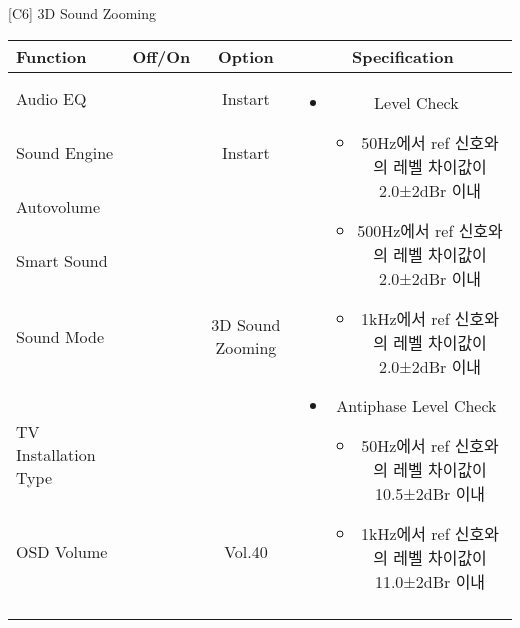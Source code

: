 \begin{frame}[t]{[C6] 3D Sound Zooming}
\begin{tiny}
\begin{tabular}{@{}lccc@{}}
\toprule
Function & Off/On & Option & Specification \\
\midrule
Audio EQ & \color{black}{Off} & Instart &
\multirow{10}{60mm}{
\begin{itemize}
\item Level Check
	\begin{itemize}
	\item 50Hz에서 ref 신호와의 레벨 차이값이 2.0±2dBr 이내
	\item 500Hz에서 ref 신호와의 레벨 차이값이 2.0±2dBr 이내
	\item 1kHz에서 ref 신호와의 레벨 차이값이 2.0±2dBr 이내
	\end{itemize}
\item Antiphase Level Check
	\begin{itemize}
	\item 50Hz에서 ref 신호와의 레벨 차이값이 10.5±2dBr 이내
	\item 1kHz에서 ref 신호와의 레벨 차이값이 11.0±2dBr 이내
	\end{itemize}
\end{itemize}
} \\
Sound Engine & \color{blue}{On} & Instart & \\
Autovolume & \color{black}{Off} & & \\
Smart Sound & \color{black}{Off} & & \\
Sound Mode & \color{blue}{On} & 3D Sound Zooming & \\
TV Installation Type & \color{blue}{On} & \color{black}{Standtype1} & \\
OSD Volume & \color{blue}{On} & Vol.40 & \\
& & & \\
& & & \\
& & & \\
& & & \\
\midrule
\end{tabular}
\end{tiny}

\end{frame}
